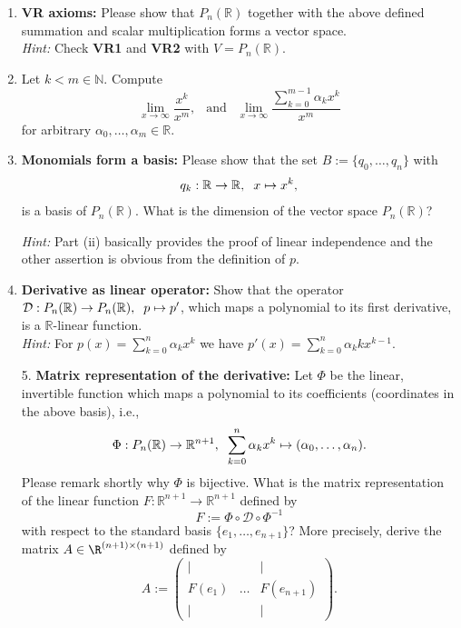 \begin{enumerate}
	\item \textbf{VR axioms:} Please show that $ P_n(\mathbb{R})$ together with the above defined summation and scalar multiplication forms a vector space.\\[0.2cm]
	\textit{Hint:} Check \textbf{VR1} and \textbf{VR2} with $V = P_n(\mathbb{R})$.
	\item Let $k<m \in \mathbb{N}$. Compute 
	$$
	\lim\limits_{x\rightarrow\infty} \frac{x^k}{x^m}, ~~\text{ and }~~ \lim\limits_{x\rightarrow\infty}  \frac{\sum_{k=0}^{m-1}\alpha_k x^k}{x^m}
	$$
	for arbitrary $\alpha_0, \dots, \alpha_m \in \mathbb{R}$.
	\item \textbf{Monomials form a basis:} Please show that the set $B := \lbrace q_0, \dots, q_n \rbrace$ with
	\begin{align*}
	q_k: \mathbb{R} \rightarrow \mathbb{R}, \hspace{.2cm} x \mapsto x^k,
	\end{align*} 
	is a basis of $P_n(\mathbb{R})$. What is the dimension of the vector space $P_n(\mathbb{R})$?
	
	\textit{Hint: } Part (ii) basically provides the proof of linear independence and the other assertion is obvious from the definition of $p$. 
	\item \textbf{Derivative as linear operator:} Show that the operator $\mathcal{D}:P_n(\mathbb{R}) \rightarrow P_n(\mathbb{R}), \hspace{.2cm} p \mapsto p'$, 
	which maps a polynomial to its first derivative, is a $\mathbb{R}$-linear function. \\[0.2cm]
	\textit{Hint: } For $p(x) = \sum_{k=0}^n \alpha_k x^k$ we have $p'(x) = \sum_{k=0}^n \alpha_k kx^{k-1}$. 					
	
	\item[5.] \textbf{Matrix representation of the derivative:}  Let $\Phi$ be the linear, invertible function which maps a polynomial to its coefficients (coordinates in the above basis), i.e.,
	$$\Phi: P_n(\mathbb{R}) \rightarrow \mathbb{R}^{n+1}, \hspace{.2cm} \sum_{k=0}^n \alpha_k x^k \mapsto (\alpha_0, \dots, \alpha_n).$$ 
	Please remark shortly why $\Phi$ is bijective.
	What is the matrix representation of the linear function
	$ F:\mathbb{R}^{n+1} \rightarrow \mathbb{R}^{n+1}$ defined by $$F :=\Phi \circ \mathcal{D} \circ \Phi^{-1}  $$ with respect to the standard basis $\lbrace e_1, \dots, e_{n+1}\rbrace$? More precisely, derive the matrix $A \in \R^{(n+1)\times (n+1)}$ defined by
	$$
	A:=\begin{pmatrix}
	|& &|\\
	F(e_1)&\dots&F(e_{n+1})\\
	|& &|
	\end{pmatrix}.
	$$
	
	
\end{enumerate}